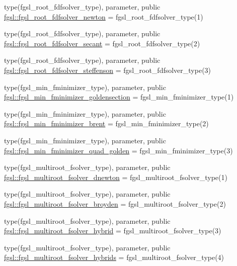 \begin{DoxyCompactItemize}
\item 
type(fgsl\+\_\+root\+\_\+fdfsolver\+\_\+type), parameter, public \hyperlink{namespacefgsl_aa05053ddddf728c909cfa5bed48b65dc}{fgsl\+::fgsl\+\_\+root\+\_\+fdfsolver\+\_\+newton} = fgsl\+\_\+root\+\_\+fdfsolver\+\_\+type(1)
\item 
type(fgsl\+\_\+root\+\_\+fdfsolver\+\_\+type), parameter, public \hyperlink{namespacefgsl_a52cb2fcd33e5ad5b7bf7303a8b47764a}{fgsl\+::fgsl\+\_\+root\+\_\+fdfsolver\+\_\+secant} = fgsl\+\_\+root\+\_\+fdfsolver\+\_\+type(2)
\item 
type(fgsl\+\_\+root\+\_\+fdfsolver\+\_\+type), parameter, public \hyperlink{namespacefgsl_aca4a5d84619cc9678ec442a1f33741aa}{fgsl\+::fgsl\+\_\+root\+\_\+fdfsolver\+\_\+steffenson} = fgsl\+\_\+root\+\_\+fdfsolver\+\_\+type(3)
\item 
type(fgsl\+\_\+min\+\_\+fminimizer\+\_\+type), parameter, public \hyperlink{namespacefgsl_a372d8c5ea330e874febcdaf090c8f8fc}{fgsl\+::fgsl\+\_\+min\+\_\+fminimizer\+\_\+goldensection} = fgsl\+\_\+min\+\_\+fminimizer\+\_\+type(1)
\item 
type(fgsl\+\_\+min\+\_\+fminimizer\+\_\+type), parameter, public \hyperlink{namespacefgsl_a0434a8f5d054ed9038714a856f8937ad}{fgsl\+::fgsl\+\_\+min\+\_\+fminimizer\+\_\+brent} = fgsl\+\_\+min\+\_\+fminimizer\+\_\+type(2)
\item 
type(fgsl\+\_\+min\+\_\+fminimizer\+\_\+type), parameter, public \hyperlink{namespacefgsl_a7c479328d8e7e7d55f2fa4908d0122c9}{fgsl\+::fgsl\+\_\+min\+\_\+fminimizer\+\_\+quad\+\_\+golden} = fgsl\+\_\+min\+\_\+fminimizer\+\_\+type(3)
\item 
type(fgsl\+\_\+multiroot\+\_\+fsolver\+\_\+type), parameter, public \hyperlink{namespacefgsl_a1621295c3bf584aab577fe54f3a89fb0}{fgsl\+::fgsl\+\_\+multiroot\+\_\+fsolver\+\_\+dnewton} = fgsl\+\_\+multiroot\+\_\+fsolver\+\_\+type(1)
\item 
type(fgsl\+\_\+multiroot\+\_\+fsolver\+\_\+type), parameter, public \hyperlink{namespacefgsl_aaa51198ecabbc2cc4e7cd469492acedc}{fgsl\+::fgsl\+\_\+multiroot\+\_\+fsolver\+\_\+broyden} = fgsl\+\_\+multiroot\+\_\+fsolver\+\_\+type(2)
\item 
type(fgsl\+\_\+multiroot\+\_\+fsolver\+\_\+type), parameter, public \hyperlink{namespacefgsl_acca2b12319b40798b2dc4dd347fcc4b5}{fgsl\+::fgsl\+\_\+multiroot\+\_\+fsolver\+\_\+hybrid} = fgsl\+\_\+multiroot\+\_\+fsolver\+\_\+type(3)
\item 
type(fgsl\+\_\+multiroot\+\_\+fsolver\+\_\+type), parameter, public \hyperlink{namespacefgsl_abd283e94024c75208f98eb64fd4a8833}{fgsl\+::fgsl\+\_\+multiroot\+\_\+fsolver\+\_\+hybrids} = fgsl\+\_\+multiroot\+\_\+fsolver\+\_\+type(4)

\end{DoxyCompactItemize}

